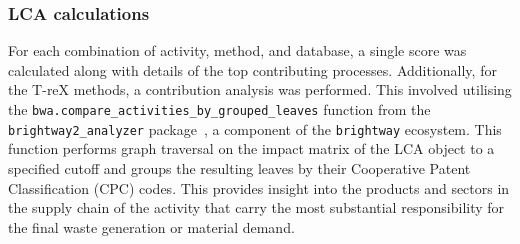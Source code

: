 \subsubsection{LCA calculations}
For each combination of activity, method, and database, a single score was calculated along with details of the top contributing processes. Additionally, for the T-reX methods, a contribution analysis was performed. This involved utilising the \texttt{bwa.compare\_activities\_by\_grouped\_leaves} function from the \texttt{brightway2\_analyzer} package~\citep{mutel2016brightway2analyzer}, a component of the \texttt{brightway} ecosystem. This function performs graph traversal on the impact matrix of the LCA object to a specified cutoff and groups the resulting leaves by their Cooperative Patent Classification (CPC) codes. This provides insight into the products and sectors in the supply chain of the activity that carry the most substantial responsibility for the final waste generation or material demand.


